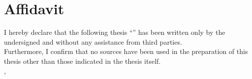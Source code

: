 \vspace*{100mm}
\begin{minipage}{109.5mm}
\section*{Affidavit}
I hereby declare that the following thesis ``\metaTitle'' has been
written only by the undersigned and without any assistance from third
parties.\\

Furthermore, I confirm that no sources have been used in the preparation
of this thesis other than those indicated in the thesis itself.\\[2cm]
\metaCity,
\metaDate%
\end{minipage}
